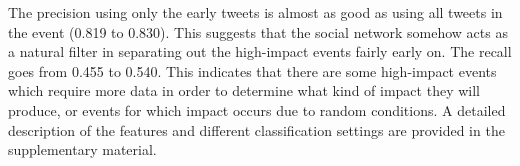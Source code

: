 The precision using only the early tweets is almost as good as using
all tweets in the event (0.819 to 0.830). This suggests that the
social network somehow acts as a natural filter in separating out the
high-impact events fairly early on.  The recall goes from 0.455 to
0.540. This indicates that there are some high-impact events which
require more data in order to determine what kind of impact they will
produce, or events for which impact occurs due to random conditions. A
detailed description of the features and different classification
settings are provided in the supplementary material.%
